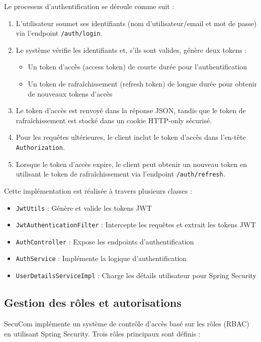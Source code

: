 Le processus d'authentification se déroule comme suit :

\begin{enumerate}
  \item L'utilisateur soumet ses identifiants (nom d'utilisateur/email et mot de passe) via l'endpoint \texttt{/auth/login}.
  \item Le système vérifie les identifiants et, s'ils sont valides, génère deux tokens :
    \begin{itemize}
      \item Un token d'accès (access token) de courte durée pour l'authentification
      \item Un token de rafraîchissement (refresh token) de longue durée pour obtenir de nouveaux tokens d'accès
    \end{itemize}
  \item Le token d'accès est renvoyé dans la réponse JSON, tandis que le token de rafraîchissement est stocké dans un cookie HTTP-only sécurisé.
  \item Pour les requêtes ultérieures, le client inclut le token d'accès dans l'en-tête \texttt{Authorization}.
  \item Lorsque le token d'accès expire, le client peut obtenir un nouveau token en utilisant le token de rafraîchissement via l'endpoint \texttt{/auth/refresh}.
\end{enumerate}

Cette implémentation est réalisée à travers plusieurs classes :

\begin{itemize}
  \item \texttt{JwtUtils} : Génère et valide les tokens JWT
  \item \texttt{JwtAuthenticationFilter} : Intercepte les requêtes et extrait les tokens JWT
  \item \texttt{AuthController} : Expose les endpoints d'authentification
  \item \texttt{AuthService} : Implémente la logique d'authentification
  \item \texttt{UserDetailsServiceImpl} : Charge les détails utilisateur pour Spring Security
\end{itemize}

\subsection{Gestion des rôles et autorisations}

SecuCom implémente un système de contrôle d'accès basé sur les rôles (RBAC) en utilisant Spring Security. Trois rôles principaux sont définis :

